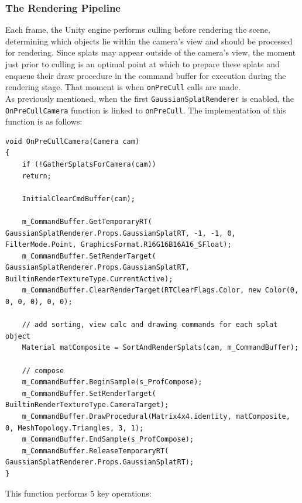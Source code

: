 \documentclass[12pt]{article}
\begin{document}
\subsubsection{The Rendering Pipeline}
Each frame, the Unity engine performs culling before rendering the scene, determining which objects lie within the camera’s view and should be processed for rendering. Since splats may appear outside of the camera’s view, the moment just prior to culling is an optimal point at which to prepare these splats and enqueue their draw procedure in the command buffer for execution during the rendering stage. That moment is when \texttt{onPreCull} calls are made.\\
As previously mentioned, when the first \texttt{GaussianSplatRenderer} is enabled, the \texttt{OnPreCullCamera} function is linked to \texttt{onPreCull}. The implementation of this function is as follows:
\begin{lstlisting}[tabsize=2,caption=\texttt{OnPreCullCamera} of \texttt{GaussianSplatRenderSystem}, label=code:systemprecull,breaklines=true,breakatwhitespace=true,basicstyle=\ttfamily\footnotesize]
void OnPreCullCamera(Camera cam)
{
	if (!GatherSplatsForCamera(cam))
	return;
	
	InitialClearCmdBuffer(cam);
	
	m_CommandBuffer.GetTemporaryRT( GaussianSplatRenderer.Props.GaussianSplatRT, -1, -1, 0, FilterMode.Point, GraphicsFormat.R16G16B16A16_SFloat);
	m_CommandBuffer.SetRenderTarget( GaussianSplatRenderer.Props.GaussianSplatRT, BuiltinRenderTextureType.CurrentActive);
	m_CommandBuffer.ClearRenderTarget(RTClearFlags.Color, new Color(0, 0, 0, 0), 0, 0);
	
	// add sorting, view calc and drawing commands for each splat object
	Material matComposite = SortAndRenderSplats(cam, m_CommandBuffer);
	
	// compose
	m_CommandBuffer.BeginSample(s_ProfCompose);
	m_CommandBuffer.SetRenderTarget( BuiltinRenderTextureType.CameraTarget);
	m_CommandBuffer.DrawProcedural(Matrix4x4.identity, matComposite, 0, MeshTopology.Triangles, 3, 1);
	m_CommandBuffer.EndSample(s_ProfCompose);
	m_CommandBuffer.ReleaseTemporaryRT( GaussianSplatRenderer.Props.GaussianSplatRT);
}
\end{lstlisting}
This function performs 5 key operations:
\end{document}
